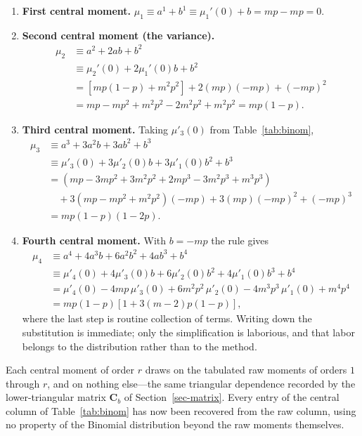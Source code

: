 \documentclass[
  12pt]{article}
\begin{document}
\begin{enumerate}
\item \textbf{First central moment.} $\mu_1 \equiv a^1+b^1 \equiv \mu_1'(0) + b = mp - mp = 0$.
\item \textbf{Second central moment (the variance).}
\begin{align*}
\mu_2 &\equiv a^2+2ab+b^2 \\
      &\equiv \mu_2'(0) + 2\mu_1'(0)b + b^2 \\
      &= \left[mp(1-p) + m^2p^2\right] + 2(mp)(-mp) + (-mp)^2 \\
      &= mp - mp^2 + m^2p^2 - 2m^2p^2 + m^2p^2 = mp(1-p).
\end{align*}
\item \textbf{Third central moment.} Taking $\mu'_3(0)$ from Table~\ref{tab:binom},
\begin{align*}
\mu_3 &\equiv a^3+3a^2b+3ab^2+b^3 \\
      &\equiv \mu'_3(0) + 3\mu'_2(0)b + 3\mu'_1(0)b^2 + b^3 \\
      &= \left(mp - 3mp^2 + 3m^2p^2 + 2mp^3 - 3m^2p^3 + m^3p^3\right) \\
      &\quad + 3\left(mp - mp^2 + m^2p^2\right)(-mp) + 3(mp)(-mp)^2 + (-mp)^3 \\
      &= mp(1-p)(1-2p).
\end{align*}
\item \textbf{Fourth central moment.} With $b = -mp$ the rule gives
\begin{align*}
\mu_4 &\equiv a^4+4a^3b+6a^2b^2+4ab^3+b^4 \\
      &\equiv \mu'_4(0) + 4\mu'_3(0)b + 6\mu'_2(0)b^2 + 4\mu'_1(0)b^3 + b^4 \\
      &= \mu'_4(0) - 4mp\,\mu'_3(0) + 6m^2p^2\,\mu'_2(0) - 4m^3p^3\,\mu'_1(0) + m^4p^4 \\
      &= mp(1-p)\left[1 + 3(m-2)p(1-p)\right],
\end{align*}
where the last step is routine collection of terms. Writing down the substitution is immediate; only the simplification is laborious, and that labor belongs to the distribution rather than to the method.
\end{enumerate}

Each central moment of order $r$ draws on the tabulated raw moments of orders $1$ through $r$, and on nothing else---the same triangular dependence recorded by the lower-triangular matrix $\mathbf{C}_b$ of Section~\ref{sec-matrix}. Every entry of the central column of Table~\ref{tab:binom} has now been recovered from the raw column, using no property of the Binomial distribution beyond the raw moments themselves.
\end{document}
